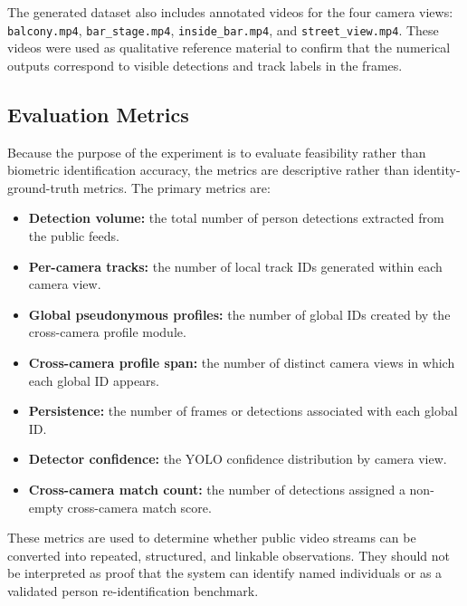 The generated dataset also includes annotated videos for the four camera views:
\texttt{balcony.mp4}, \texttt{bar\_stage.mp4}, \texttt{inside\_bar.mp4}, and
\texttt{street\_view.mp4}. These videos were used as qualitative reference
material to confirm that the numerical outputs correspond to visible detections
and track labels in the frames.

\subsection{Evaluation Metrics}
\label{subsec:evaluation-metrics}

Because the purpose of the experiment is to evaluate feasibility rather than
biometric identification accuracy, the metrics are descriptive rather than
identity-ground-truth metrics. The primary metrics are:

\begin{itemize}
    \item \textbf{Detection volume:} the total number of person detections
    extracted from the public feeds.
    \item \textbf{Per-camera tracks:} the number of local track IDs generated
    within each camera view.
    \item \textbf{Global pseudonymous profiles:} the number of global IDs
    created by the cross-camera profile module.
    \item \textbf{Cross-camera profile span:} the number of distinct camera
    views in which each global ID appears.
    \item \textbf{Persistence:} the number of frames or detections associated
    with each global ID.
    \item \textbf{Detector confidence:} the YOLO confidence distribution by
    camera view.
    \item \textbf{Cross-camera match count:} the number of detections assigned a
    non-empty cross-camera match score.
\end{itemize}

These metrics are used to determine whether public video streams can be
converted into repeated, structured, and linkable observations. They should not
be interpreted as proof that the system can identify named individuals or as a
validated person re-identification benchmark.
